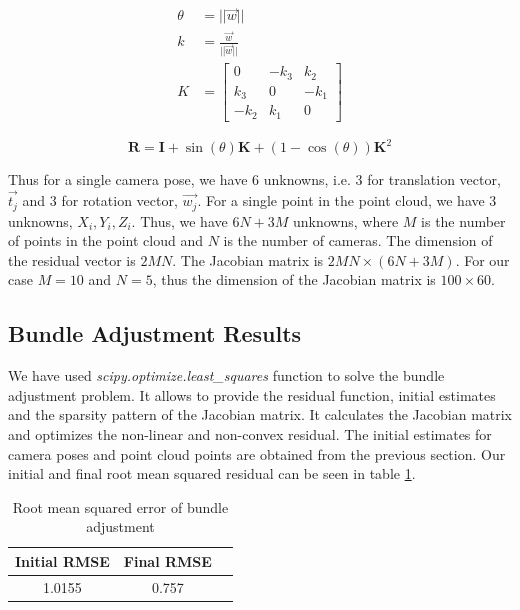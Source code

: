 \documentclass{article}
\begin{document}

\begin{align}
    \theta &= ||\vec{w}|| \\
    k &= \frac{\vec{w}}{||\vec{w}||} \\
    K &= \begin{bmatrix} 0 & -k_3 & k_2 \\ k_3 & 0 & -k_1 \\ -k_2 & k_1 & 0 \end{bmatrix}
\end{align}


\begin{equation}
    \mathbf{R} = \mathbf{I} + \sin(\theta) \mathbf{K} + (1 - \cos(\theta)) \mathbf{K}^2
\end{equation}

Thus for a single camera pose, we have 6 unknowns, i.e. 3 for translation vector, $\vec{t_j}$ and 3 for rotation vector, $\vec{w_j}$. For a single point in the point cloud, 
we have 3 unknowns, $X_i, Y_i, Z_i$. Thus, we have $6N + 3M$ unknowns, where $M$ is the number of points in the point cloud and $N$ is the number of cameras. 
The dimension of the residual vector is $2MN$. The Jacobian matrix is $2MN \times (6N + 3M)$. For our case $M = 10$ and $N = 5$, thus the dimension of the Jacobian matrix is $100 \times 60$.


\subsection{Bundle Adjustment Results}
We have used \textit{scipy.optimize.least\_squares} function to solve the bundle adjustment problem. It allows to provide the residual function, initial estimates and the sparsity pattern of the Jacobian matrix.
It calculates the Jacobian matrix and optimizes the non-linear and non-convex residual. The initial estimates for camera poses and point cloud points are obtained from the previous section.
Our initial and final root mean squared residual can be seen in table \ref{tab:bundle_adjustment_rmse}.

\begin{table}[h]
    \centering
    \begin{tabular}{|c|c|c|}
        \hline
        Initial RMSE & Final RMSE \\
        \hline
        1.0155 & 0.757 \\
        \hline
    \end{tabular}
    \caption{Root mean squared error of bundle adjustment}
    \label{tab:bundle_adjustment_rmse}
\end{table}
\end{document}
